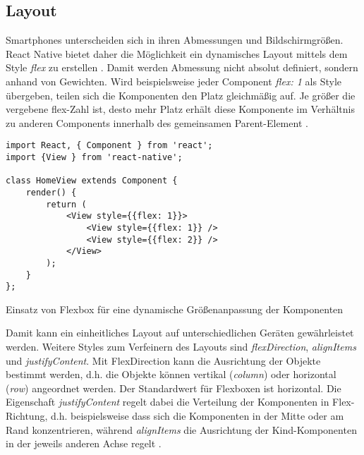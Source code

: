\subsection{Layout}
Smartphones unterscheiden sich in ihren Abmessungen und Bildschirmgrößen. React Native bietet daher die Möglichkeit ein dynamisches Layout mittels dem Style \textit{flex} zu erstellen \cite{facebook_inc._flex_2017}.  Damit werden Abmessung nicht absolut definiert, sondern anhand von Gewichten. Wird beispielsweise jeder Component \textit{flex: 1} als Style übergeben, teilen sich die Komponenten den Platz gleichmäßig auf. Je größer die vergebene flex-Zahl ist, desto mehr Platz erhält diese Komponente im Verhältnis zu anderen Components innerhalb des gemeinsamen Parent-Element \cite{facebook_inc._flex_2017}. 

\begin{listing}[H]
    \begin{verbatim}
import React, { Component } from 'react';
import {View } from 'react-native';

class HomeView extends Component {
    render() {
        return (
            <View style={{flex: 1}}>
                <View style={{flex: 1}} />
                <View style={{flex: 2}} />
            </View>
        );
    }
};

    \end{verbatim}
    \caption{Einsatz von Flexbox für eine dynamische Größenanpassung der Komponenten}
    \label{lst:flex}
\end{listing}
Damit kann ein einheitliches Layout auf unterschiedlichen Geräten gewährleistet werden. Weitere Styles zum Verfeinern des Layouts sind \textit{flexDirection}, \textit{alignItems} und \textit{justifyContent}. Mit FlexDirection kann die Ausrichtung der Objekte bestimmt werden, d.h. die Objekte können vertikal (\textit{column}) oder horizontal (\textit{row}) angeordnet werden. Der Standardwert für Flexboxen ist horizontal. Die Eigenschaft \textit{justifyContent} regelt dabei die Verteilung der Komponenten in Flex-Richtung, d.h. beispielsweise dass sich die Komponenten in der Mitte oder am Rand konzentrieren, während \textit{alignItems} die Ausrichtung der Kind-Komponenten in der jeweils anderen Achse regelt \cite{facebook_inc._flex_2017}. \\



